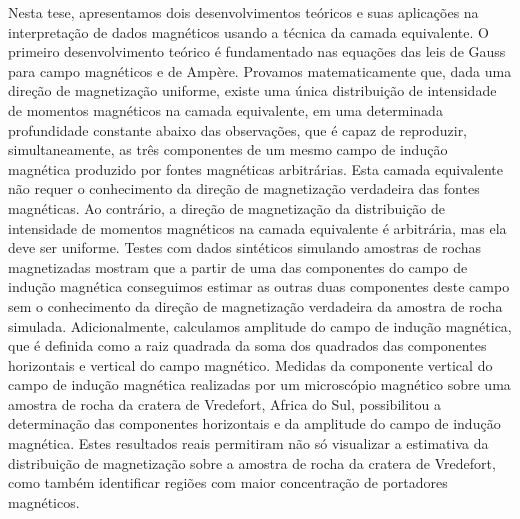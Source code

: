 Nesta tese, apresentamos dois desenvolvimentos teóricos e suas aplicações na interpretação de dados magnéticos usando a técnica da camada equivalente. 
O primeiro desenvolvimento teórico é fundamentado nas equações das leis de Gauss para campo magnéticos e de Ampère. Provamos matematicamente que, dada uma direção de magnetização uniforme, existe uma única distribuição de intensidade de momentos magnéticos na camada equivalente,  em uma determinada profundidade constante abaixo das observações, que é capaz de reproduzir, simultaneamente, as três componentes de um mesmo campo de indução magnética produzido por fontes magnéticas arbitrárias. Esta camada equivalente não requer o conhecimento da direção de magnetização verdadeira das fontes magnéticas. Ao contrário, a direção de magnetização da distribuição de intensidade de momentos magnéticos na camada equivalente é arbitrária, mas ela deve ser uniforme. Testes com dados sintéticos simulando amostras de rochas magnetizadas mostram que a partir de uma das componentes do campo de indução magnética conseguimos estimar as outras duas componentes deste campo sem o conhecimento da direção de magnetização verdadeira da amostra de rocha simulada. Adicionalmente, calculamos amplitude do campo de indução magnética, que é definida como a raiz quadrada da soma dos quadrados das componentes horizontais e vertical do campo magnético. Medidas da componente vertical do campo de indução magnética realizadas por um microscópio magnético sobre uma amostra de rocha da cratera de Vredefort, Africa do Sul, possibilitou a determinação das componentes horizontais e da amplitude do campo de indução magnética. Estes resultados reais permitiram não só visualizar a estimativa da distribuição de magnetização sobre a amostra de rocha da cratera de Vredefort, como também identificar regiões com maior concentração de portadores  magnéticos.

